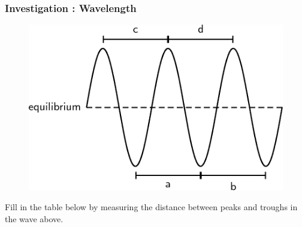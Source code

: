             \subsubsection{  Investigation : Wavelength }
            \nopagebreak
        \label{m38806*id318517}
    \setcounter{subfigure}{0}
	\begin{figure}[H] %
    \begin{center}
    \label{m38806*id318520!!!underscore!!!media}\label{m38806*id318520!!!underscore!!!printimage}\includegraphics[width=0.5\columnwidth]{col11305.imgs/m38806_PG10C5_007.png} %
      \vspace{2pt}
    \vspace{.1in}
    \end{center}
 \end{figure}       
        \par 
        \label{m38806*id318526}Fill in the table below by measuring the distance between peaks and troughs in the wave above.\par 
